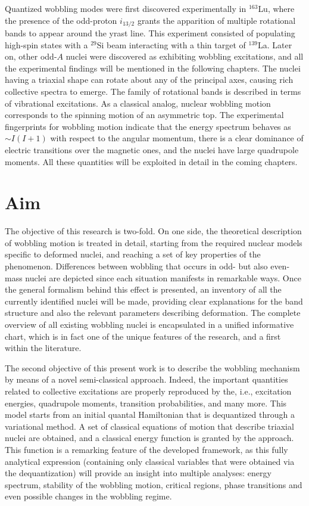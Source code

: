 Quantized wobbling modes were first discovered experimentally in $^{163}$Lu, where the presence of the odd-proton $i_{13/2}$ grants the apparition of multiple rotational bands to appear around the yrast line. This experiment consisted of populating high-spin states with a $^{29}$Si beam interacting with a thin target of $^{139}$La. Later on, other odd-$A$ nuclei were discovered as exhibiting wobbling excitations, and all the experimental findings will be mentioned in the following chapters. The nuclei having a triaxial shape can rotate about any of the principal axes, causing rich collective spectra to emerge. The family of rotational bands is described in terms of vibrational excitations. As a classical analog, nuclear wobbling motion corresponds to the spinning motion of an asymmetric top. The experimental fingerprints for wobbling motion indicate that the energy spectrum behaves as $\sim I(I+1)$ with respect to the angular momentum, there is a clear dominance of electric transitions over the magnetic ones, and the nuclei have large quadrupole moments. All these quantities will be exploited in detail in the coming chapters.

\section{Aim}

The objective of this research is two-fold. On one side, the theoretical description of wobbling motion is treated in detail, starting from the required nuclear models specific to deformed nuclei, and reaching a set of key properties of the phenomenon. Differences between wobbling that occurs in odd- but also even-mass nuclei are depicted since each situation manifests in remarkable ways. Once the general formalism behind this effect is presented, an inventory of all the currently identified nuclei will be made, providing clear explanations for the band structure and also the relevant parameters describing deformation. The complete overview of all existing wobbling nuclei is encapsulated in a unified informative chart, which is in fact one of the unique features of the research, and a first within the literature.

The second objective of this present work is to describe the wobbling mechanism by means of a novel semi-classical approach. Indeed, the important quantities related to collective excitations are properly reproduced by the, i.e., excitation energies, quadrupole moments, transition probabilities, and many more. This model starts from an initial quantal Hamiltonian that is dequantized through a variational method. A set of classical equations of motion that describe triaxial nuclei are obtained, and a classical energy function is granted by the approach. This function is a remarking feature of the developed framework, as this fully analytical expression (containing only classical variables that were obtained via the dequantization) will provide an insight into multiple analyses: energy spectrum, stability of the wobbling motion, critical regions, phase transitions and even possible changes in the wobbling regime. 

